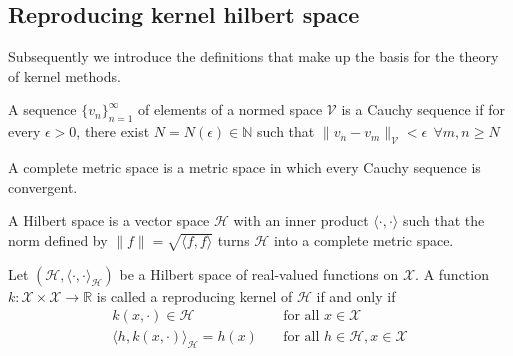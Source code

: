 \subsection{Reproducing kernel hilbert space}
Subsequently we introduce the definitions that make up the basis for the theory of kernel methods.


\begin{definition}
    A sequence $\{v_n\}_{n=1}^{\infty}$ of elements of a normed space $\mathcal{V}$ is a Cauchy sequence if for every $\epsilon>0$, there exist $N=N(\epsilon) \in \mathbb{N}$ such that $\|v_n-v_m\|_{\mathcal{V}}<\epsilon \ \ \forall m,n\geq N$  
\end{definition}


\begin{definition}
    A complete metric space is a metric space in which every Cauchy sequence is convergent.
\end{definition}


\begin{definition}
    A Hilbert space is a vector space $\mathcal{H}$ with an inner product $\langle \cdot, \cdot \rangle$ such that the norm defined by $\|f\|=\sqrt{\langle f, f \rangle}$
turns $\mathcal{H}$ into a complete metric space.
\end{definition}


\begin{definition}
    Let $(\mathcal{H}, \langle \cdot, \cdot \rangle_\mathcal{H})$ be a Hilbert space of real-valued functions on $\mathcal{X}$. A function $k: \mathcal{X} \times \mathcal{X} \to \mathbb{R}$ is called a reproducing kernel of $\mathcal{H}$ if and only if 
     \begin{align}
        k(x, \cdot) \in \mathcal{H} &\quad \text{for all   } x \in \mathcal{X}    \\
        \langle  h, k(x, \cdot) \rangle_\mathcal{H} = h(x) &\quad \text{for all   } h \in \mathcal{H}, x \in \mathcal{X}
    \end{align}
\end{definition}
   


